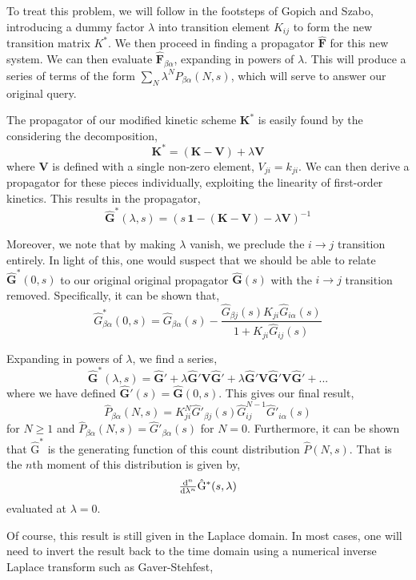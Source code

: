 \documentclass{article}
\begin{document}
To treat this problem, we will follow in the footsteps of Gopich and
Szabo\cite{Gopich2003}, introducing a dummy factor $\lambda$ into
transition element $K_{ij}$ to form the new transition matrix $K^*$.
We then proceed in finding a propagator $\mathbf{\hat F}$ for this new
system. We can then evaluate $\mathbf{\hat F}_{\beta\alpha}$,
expanding in powers of $\lambda$. This will produce a series of terms
of the form $\sum_N \lambda^N P_{\beta\alpha}(N, s)$, which will serve
to answer our original query.

The propagator of our modified kinetic scheme $\mathbf{K}^*$ is easily
found by the considering the decomposition,
\[ \mathbf{K}^* = (\mathbf{K} - \mathbf{V}) + \lambda \mathbf{V} \]
where $\mathbf V$ is defined with a single non-zero element, $V_{ji} =
k_{ji}$. 
We can then derive a propagator for these pieces
individually, exploiting the linearity of first-order kinetics.
This results in the propagator,
\[ \mathbf{\hat G}^*(\lambda, s) = \left(s\, \mathbf{1} - (\mathbf{K} - \mathbf{V}) - \lambda \mathbf{V} \right)^{-1} \]

Moreover, we note that by making $\lambda$ vanish, we preclude the $i
\rightarrow j$ transition entirely. In light of this, one would suspect that we should
be able to relate $\mathbf{\hat G^*}(0, s)$ to our original original
propagator $\mathbf{\hat G}(s)$ with the $i \rightarrow j$ transition
removed. Specifically, it can be shown that,
\[ \hat G^*_{\beta\alpha}(0, s) = \hat G_{\beta\alpha}(s) -
\frac{\hat G_{\beta j}(s) K_{ji} \hat G_{i\alpha}(s)}{1 + K_{ji} \hat G_{ij}(s)}
\]

Expanding in powers of $\lambda$, we find a series,
\[ \mathbf{\hat G}^*(\lambda, s) = \mathbf{\hat G'}
  + \lambda \mathbf{\hat G'} \mathbf{V} \mathbf{\hat G'}
  + \lambda \mathbf{\hat G'} \mathbf{V} \mathbf{\hat G'} \mathbf{V} \mathbf{\hat G'}
  + ...
\]
where we have defined $\mathbf{\hat G'}(s) = \mathbf{\hat G}(0, s)$.
This gives our final result,
\[ \hat P_{\beta\alpha}(N,s) = K_{ji}^N \hat G'_{\beta j}(s) \hat G_{ij}^{N-1} \hat G'_{i\alpha}(s) \]
for $N \ge 1$ and $\hat P_{\beta\alpha}(N,s) = \hat
G'_{\beta\alpha}(s)$ for $N=0$. Furthermore, it can be shown that $\mathrm{\hat G^*}$ is the generating function of this count distribution $\hat P(N,s)$. That is the $n$th moment of this
distribution is given by,
\[ \od[n]{}{\lambda} \mathrm{\hat G^*}(s, \lambda) \]
evaluated at $\lambda = 0$.

Of course, this result is still given in the Laplace domain. In most
cases, one will need to invert the result back to the time domain
using a numerical inverse Laplace transform such as Gaver-Stehfest,
\end{document}
